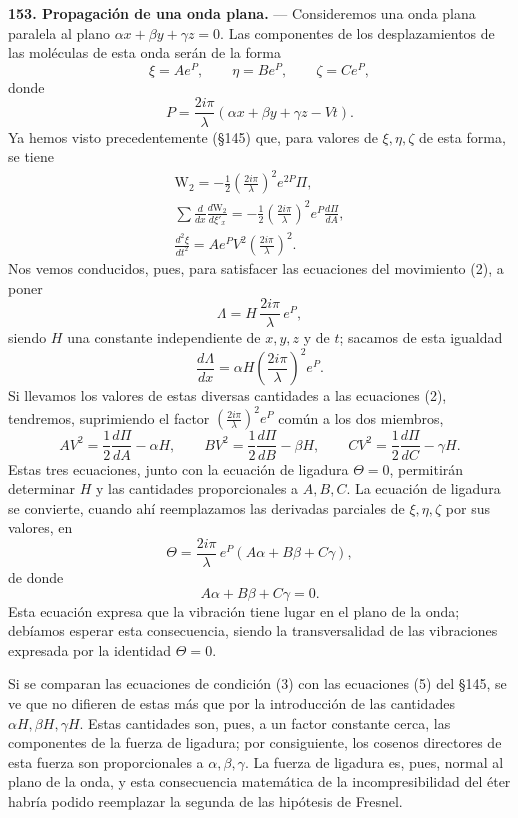 \noindent\textbf{153. Propagación de una onda plana.} — Consideremos una
onda plana paralela al plano $\alpha x+\beta y+\gamma z=0$. Las
componentes de los desplazamientos de las moléculas de esta onda serán de
la forma
\[
\xi=Ae^{P},\qquad \eta=Be^{P},\qquad \zeta=Ce^{P},
\]
donde
\[
P=\frac{2i\pi}{\lambda}(\alpha x+\beta y+\gamma z-Vt).
\]
Ya hemos visto precedentemente (§145) que, para valores de $\xi,\eta,\zeta$
de esta forma, se tiene
\begin{gather*}
\mathrm{W}_2=-\frac{1}{2}\left(\frac{2i\pi}{\lambda}\right)^2 e^{2P}\Pi,\\
\sum\frac{d}{dx}\frac{d\mathrm{W}_2}{d\xi'_x}=-\frac{1}{2}\left(\frac{2i\pi}{\lambda}\right)^2 e^{P}\frac{d\Pi}{dA},\\
\frac{d^2\xi}{dt^2}=Ae^{P}V^2\left(\frac{2i\pi}{\lambda}\right)^2.
\end{gather*}
Nos vemos conducidos, pues, para satisfacer las ecuaciones del movimiento
(2), a poner
\[
\Lambda=H\,\frac{2i\pi}{\lambda}\,e^{P},
\]
siendo $H$ una constante independiente de $x,y,z$ y de $t$; sacamos de
esta igualdad
\[
\frac{d\Lambda}{dx}=\alpha H\left(\frac{2i\pi}{\lambda}\right)^2 e^{P}.
\]
Si llevamos los valores de estas diversas cantidades a las ecuaciones (2),
tendremos, suprimiendo el factor $\left(\frac{2i\pi}{\lambda}\right)^2 e^{P}$
común a los dos miembros,
\begin{equation}
AV^2=\frac{1}{2}\frac{d\Pi}{dA}-\alpha H,\qquad
BV^2=\frac{1}{2}\frac{d\Pi}{dB}-\beta H,\qquad
CV^2=\frac{1}{2}\frac{d\Pi}{dC}-\gamma H.
\tag{3}
\end{equation}
Estas tres ecuaciones, junto con la ecuación de ligadura $\Theta=0$,
permitirán determinar $H$ y las cantidades proporcionales a $A,B,C$. La
ecuación de ligadura se convierte, cuando ahí reemplazamos las derivadas
parciales de $\xi,\eta,\zeta$ por sus valores, en
\[
\Theta=\frac{2i\pi}{\lambda}\,e^{P}(A\alpha+B\beta+C\gamma),
\]
de donde
\begin{equation}
A\alpha+B\beta+C\gamma=0.
\tag{4}
\end{equation}
Esta ecuación expresa que la vibración tiene lugar en el plano de la onda;
debíamos esperar esta consecuencia, siendo la transversalidad de las
vibraciones expresada por la identidad $\Theta=0$.

Si se comparan las ecuaciones de condición (3) con las ecuaciones (5) del
§145, se ve que no difieren de estas más que por la
introducción de las cantidades $\alpha H,\beta H,\gamma H$. Estas
cantidades son, pues, a un factor constante cerca, las componentes de la
fuerza de ligadura; por consiguiente, los cosenos directores de esta
fuerza son proporcionales a $\alpha,\beta,\gamma$. La fuerza de ligadura
es, pues, normal al plano de la onda, y esta consecuencia matemática de la
incompresibilidad del éter habría podido reemplazar la segunda de las
hipótesis de Fresnel.

